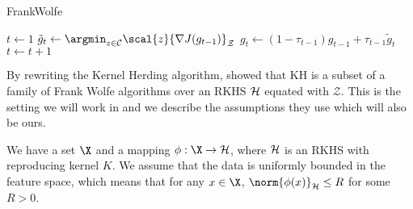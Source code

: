 \begin{algorithm}
  \caption{FrankWolfe}\label{alg:frank-wolfe}
  \begin{algorithmic}[1]
     \State $t \gets 1$  \State $\tilde{g}_{t} \gets
    \argmin_{z \in \mathcal{C}} \scal{z}{\nabla J(g_{t-1})}_{\mathcal{Z}}$ \State $g_{t}
    \gets (1 - \tau_{t-1})g_{t-1} + \tau_{t-1}\tilde{g}_t$ \State $t \gets t + 1$
    \EndWhile
    \EndProcedure
  \end{algorithmic}
\end{algorithm}

By rewriting the Kernel Herding algorithm,
\citep{bach12_equiv_between_herdin_condit_gradien_algor} showed that KH is a
subset of a family of Frank Wolfe algorithms over an RKHS \(\mathcal{H}\) equated
with \(\mathcal{Z}\). This is the setting we will work in and we describe the
assumptions they use which will also be ours.

\begin{assumption}
\label{as:fw-kernel-herding} We have a set \(\X\) and a mapping \(\phi: \X \to
\rkhs{H}\), where \(\mathcal{H}\) is an RKHS with reproducing kernel \(K\). We
assume that the data is uniformly bounded in the feature space, which means that
for any \(x \in \X\), \(\norm{\phi(x)}_{\rkhs{H}} \leq R\) for some \(R > 0\).
\end{assumption}

